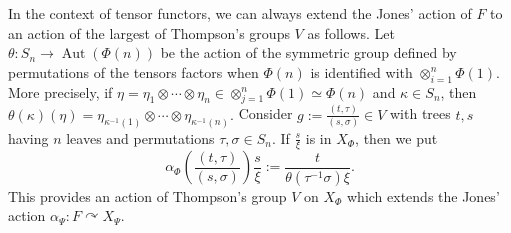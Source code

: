 \documentclass[a4paper,12pt]{amsart}
\numberwithin{equation}{section}
\theoremstyle{definition}
\newcommand{\act}{\curvearrowright}
\newcommand{\al}{\alpha}
\DeclareMathOperator{\Aut}{Aut}
\newcommand{\ot}{\otimes}\newcommand{\otmin}{\otimes_{\text{min}}}
\begin{document}
In the context of tensor functors, we can always extend the Jones' action of $F$ to an action of the largest of Thompson's groups $V$ as follows.
Let $\theta:S_n\to \Aut(\Phi(n))$ be the action of the symmetric group defined by permutations of the tensors factors when $\Phi(n)$ is identified with $\ot_{i=1}^n \Phi(1)$.
More precisely, if $\eta=\eta_1\ot\cdots\ot\eta_n\in \ot_{j=1}^n\Phi(1) \simeq \Phi(n)$ and $\kappa\in S_n$, then $\theta( \kappa )(\eta) = \eta_{ \kappa^{-1} (1) } \ot\cdots\ot \eta_{ \kappa^{ -1 } ( n ) }.$
Consider $g:=\tfrac{(t , \tau)}{(s,\sigma)}\in V$ with trees $t,s$ having $n$ leaves and permutations $\tau,\sigma\in S_n$.
If $\tfrac{s}{\xi}$ is in $X_\Phi$, then we put
$$\alpha_{\Phi} \left( \dfrac{(t,\tau)}{(s,\sigma)} \right) \dfrac{s}{\xi} := \dfrac{t}{\theta(\tau^{-1}\sigma) \xi}.$$
This provides an action of Thompson's group $V$ on $X_\Phi$ which extends the Jones' action $\al_\Psi:F\act X_\Psi.$
\end{document}
